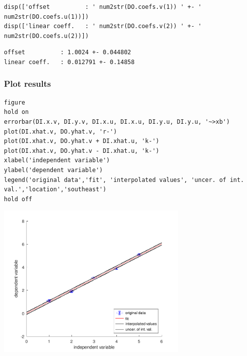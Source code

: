 \begin{lstlisting}
disp(['offset          : ' num2str(DO.coefs.v(1)) ' +- ' num2str(DO.coefs.u(1))])
disp(['linear coeff.   : ' num2str(DO.coefs.v(2)) ' +- ' num2str(DO.coefs.u(2))])
\end{lstlisting}
\begin{lstlisting}[language={},xleftmargin=5pt,frame=none]
offset          : 1.0024 +- 0.044802
linear coeff.   : 0.012791 +- 0.14858

\end{lstlisting}


{}
\subsubsection*{Plot results}

\begin{lstlisting}
figure
hold on
errorbar(DI.x.v, DI.y.v, DI.x.u, DI.x.u, DI.y.u, DI.y.u, '~>xb')
plot(DI.xhat.v, DO.yhat.v, 'r-')
plot(DI.xhat.v, DO.yhat.v + DI.xhat.u, 'k-')
plot(DI.xhat.v, DO.yhat.v - DI.xhat.u, 'k-')
xlabel('independent variable')
ylabel('dependent variable')
legend('original data','fit', 'interpolated values', 'uncer. of int. val.','location','southeast')
hold off
\end{lstlisting}
\begin{center}
\includegraphics[width=0.7\textwidth]{algs_examples_published/ISOTS28037_alg_example-1.pdf}
\end{center}


\stopcontents[localtoc]
